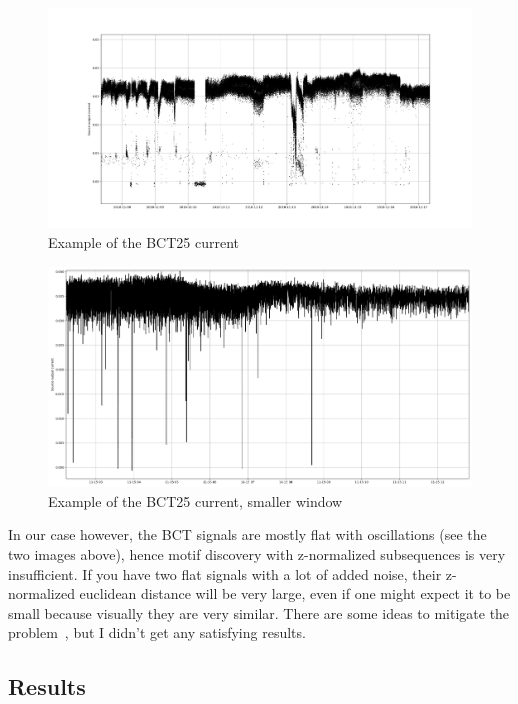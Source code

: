 \documentclass[12pt,a4paper]{article}
\begin{document}
\begin{figure}
\centering
\includegraphics{images/current_demo.png}
\caption{Example of the BCT25 current}
\end{figure}

\begin{figure}
\centering
\includegraphics{images/current_demo_2.png}
\caption{Example of the BCT25 current, smaller window}
\end{figure}

In our case however, the BCT signals are mostly flat with oscillations (see the two images above), hence motif discovery with z-normalized subsequences is very insufficient. If you have two flat signals with a lot of added noise, their z-normalized euclidean distance will be very large, even if one might expect it to be small because visually they are very similar. There are some ideas to mitigate the problem~\cite{Paepe:EliminatingNoiseMatrix}, but I didn't get any satisfying results.

\hypertarget{results}{%
\subsection{Results}\label{results}}
\end{document}
